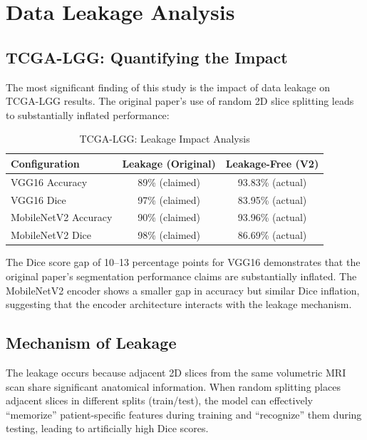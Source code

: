 \documentclass[11pt,a4paper,twoside]{report}
\newcommand{\dataset}[1]{\textsc{#1}}
\begin{document}
\section{Data Leakage Analysis}

\subsection{TCGA-LGG: Quantifying the Impact}

The most significant finding of this study is the impact of data leakage on \dataset{TCGA}-LGG results. The original paper's use of random 2D slice splitting leads to substantially inflated performance:

\begin{table}[htbp]
\centering
\caption{TCGA-LGG: Leakage Impact Analysis}
\label{tab:tcga_leakage}
\begin{tabular}{lcc}
\toprule
\textbf{Configuration} & \textbf{Leakage (Original)} & \textbf{Leakage-Free (V2)} \\
\midrule
VGG16 Accuracy & 89\% (claimed) & 93.83\% (actual) \\
VGG16 Dice & 97\% (claimed) & 83.95\% (actual) \\
MobileNetV2 Accuracy & 90\% (claimed) & 93.96\% (actual) \\
MobileNetV2 Dice & 98\% (claimed) & 86.69\% (actual) \\
\bottomrule
\end{tabular}
\end{table}

The Dice score gap of 10--13 percentage points for VGG16 demonstrates that the original paper's segmentation performance claims are substantially inflated. The MobileNetV2 encoder shows a smaller gap in accuracy but similar Dice inflation, suggesting that the encoder architecture interacts with the leakage mechanism.

\subsection{Mechanism of Leakage}

The leakage occurs because adjacent 2D slices from the same volumetric MRI scan share significant anatomical information. When random splitting places adjacent slices in different splits (train/test), the model can effectively ``memorize'' patient-specific features during training and ``recognize'' them during testing, leading to artificially high Dice scores.
\end{document}
